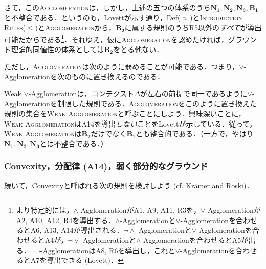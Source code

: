 \documentclass[twoside,14Q,dvipdfmx]{jsarticle}
\theoremstyle{definition}
\begin{document}
さて，この\textsc{Agglomeration}は，しかし，上述の五つの体系のうち$\mathbf{N_{1}, N_{2}, N_{3}, B_{1}}$と不整合である．というのも，Lovett\cite[Appendix A.3]{Lovett2020}が示す通り，Def($\approx$)と\textsc{Introduction Rules($\leq$)}と\textsc{Agglomeration}から，$\mathbf{B_{2}}$に属する規則のうちR5以外の\emph{すべて}が導出可能だからである\footnote{
より特定的には，$\land$-AgglomerationがA1, A9, A11, R3を，$\lor$-AgglomerationがA2, A10, A12, R4を導出する．$\land$-Agglomerationと$\lor$-Agglomerationを合わせるとA6, A13, A14が導出される．$\lnot\land$-Agglomerationと$\lor$-Agglomerationを合わせるとA4が，$\lnot\lor$-Agglomerationと$\land$-Agglomerationを合わせるとA5が出る．$\lnot\lnot$-AgglomerationはA8, R6を導出し，これと$\lor$-Agglomerationを合わせるとA7を導出できる (Lovett\cite[Appendix A.3]{Lovett2020})．
}．それゆえ，仮に\textsc{Agglomeration}を認めたければ，グラウンド理論的同値性の体系としては$\mathbf{B_{2}}$をとる他ない．

ただし，\textsc{Agglomeration}は次のように弱めることが可能である．つまり，$\lor$-Agglomerationを次のものに置き換えるのである．

\begin{prooftree}
\end{prooftree}

\noindent Weak $\lor$-Agglomerationは，コンテクスト$\Delta$が左右の前提で同一であるように$\lor$-Agglomerationを制限した規則である．\textsc{Agglomeration}をこのように置き換えた規則の集合を\textsc{Weak Agglomeration}と呼ぶことにしよう．興味深いことに，\textsc{Weak Agglomeration}はA14を導出\emph{しない}ことをLovett\cite[pp.21-3]{Lovett2020}が示している．従って，\textsc{Weak Agglomeration}は$\mathbf{B_{2}}$だけでなく$\mathbf{B_{1}}$とも整合的である．（一方で，やはり$\mathbf{N_{1}, N_{2}, N_{3}}$とは不整合である．）
%
%
%
\subsubsection{Convexity，分配律 (A14)，弱く部分的なグラウンド}\label{convexity}
続いて，Convexityと呼ばれる次の規則を検討しよう (cf. Kr\"{a}mer and Roski\cite{KramerandRoski2015})．

\begin{prooftree}
\end{prooftree}
\end{document}
